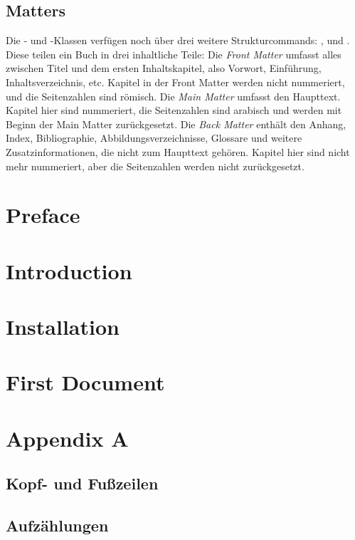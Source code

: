 \section{Matters}
Die - und -Klassen verfügen noch über drei weitere Strukturcommands: ,  und .
Diese teilen ein Buch in drei inhaltliche Teile:
Die \emph{Front Matter} umfasst alles zwischen Titel und dem ersten Inhaltskapitel, also Vorwort, Einführung, Inhaltsverzeichnis, etc.
Kapitel in der Front Matter werden nicht nummeriert, und die Seitenzahlen sind römisch.
Die \emph{Main Matter} umfasst den Haupttext.
Kapitel hier sind nummeriert, die Seitenzahlen sind arabisch und werden mit Beginn der Main Matter zurückgesetzt.
Die \emph{Back Matter} enthält den Anhang, Index, Bibliographie, Abbildungsverzeichnisse, Glossare und weitere Zusatzinformationen, die nicht zum Haupttext gehören.
Kapitel hier sind nicht mehr nummeriert, aber die Seitenzahlen werden nicht zurückgesetzt.
\begin{latexlisting}
	\maketitle
	\frontmatter
	\chapter{Preface}
	\blindtext[4]

	\clearpage
	\tableofcontents
	\clearpage

	\chapter{Introduction}
	\blindtext[2]

	\mainmatter

	\chapter{Installation}
	\blindtext[10]

	\chapter{First Document}
	\blindtext[10]

	\backmatter
	\chapter{Appendix A}
	\blindtext[5]
\end{latexlisting}

\section{Kopf- und Fußzeilen}

\section{Aufzählungen}
